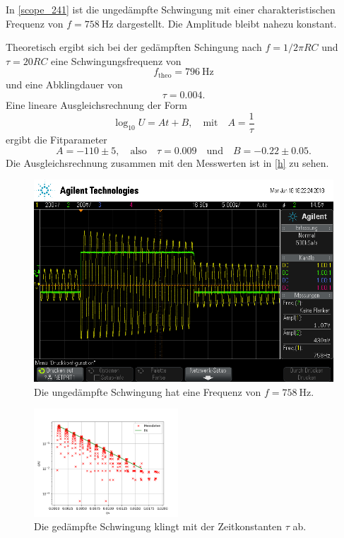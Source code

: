 In \autoref{scope_241} ist die ungedämpfte Schwingung mit einer charakteristischen Frequenz von $f = \SI{758}{\hertz}$ dargestellt. Die Amplitude bleibt nahezu konstant.\par
Theoretisch ergibt sich bei der gedämpften Schingung nach $f = 1 / 2\pi RC$ und $\tau = 20RC$ eine Schwingungsfrequenz von
\begin{equation*}
	f_\text{theo} = \SI{796}{\hertz}
\end{equation*}
und eine Abklingdauer von
\begin{equation*}
	\tau = 0.004.
\end{equation*}
Eine lineare Ausgleichsrechnung der Form
\begin{equation}
	\log_{10} U = At + B, \quad \text{mit} \quad A = \frac{1}{\tau}
\end{equation}
ergibt die Fitparameter
\begin{equation*}
	A = -110 \pm 5, \quad \text{also} \quad \tau = 0.009 \quad \text{und} \quad B = -0.22 \pm 0.05.
\end{equation*}
Die Ausgleichsrechnung zusammen mit den Messwerten ist in \autoref{h} zu sehen.
\begin{figure}[h]
	\centering
	\includegraphics[width=\textwidth]{usb/scope_241.png}
	\caption{Die ungedämpfte Schwingung hat eine Frequenz von $f = \SI{758}{\hertz}$.}
	\label{scope_241}
\end{figure}
\begin{figure}[h]
	\centering
	\includegraphics[width=0.48\textwidth]{img/h.png}
	\caption{Die gedämpfte Schwingung klingt mit der Zeitkonstanten $\tau$ ab.}
	\label{h}
\end{figure}

